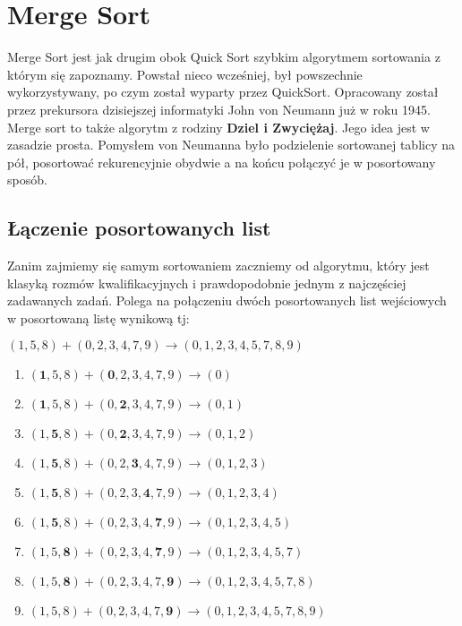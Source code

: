 \documentclass[knowledge.tex]{subfiles}
\begin{document}
    \section{Merge Sort}
    Merge Sort jest jak drugim obok Quick Sort szybkim algorytmem sortowania z którym się zapoznamy. Powstał nieco wcześniej, był powszechnie wykorzystywany, po czym został wyparty przez QuickSort. Opracowany został przez prekursora dzisiejszej informatyki John von Neumann już w roku 1945.\\[0.3cm]
    Merge sort to także algorytm z rodziny \textbf{Dziel i Zwyciężaj}. Jego idea jest w zasadzie prosta. Pomysłem von Neumanna było podzielenie sortowanej tablicy na pół, posortować rekurencyjnie obydwie a na końcu połączyć je w posortowany sposób.\\[0.3cm]
    \subsection*{Łączenie posortowanych list}
    Zanim zajmiemy się samym sortowaniem zaczniemy od algorytmu, który jest klasyką rozmów kwalifikacyjnych i prawdopodobnie jednym z najczęściej zadawanych zadań. Polega na połączeniu dwóch posortowanych list wejściowych w posortowaną listę wynikową tj:
    \begin{center}
        $(1, 5, 8) + (0, 2, 3, 4, 7, 9) \rightarrow (0,1,2,3,4,5,7,8,9)$
    \end{center}
    
    \begin{enumerate}
        \item $(\textbf{1}, 5, 8) + (\textbf{0}, 2, 3, 4, 7, 9) \rightarrow (0)$
        \item $(\textbf{1}, 5, 8) + (0, \textbf{2}, 3, 4, 7, 9) \rightarrow  (0,1)$
        \item $(1, \textbf{5}, 8) + (0, \textbf{2}, 3, 4, 7, 9) \rightarrow  (0,1,2)$
        \item $(1, \textbf{5}, 8) + (0, 2, \textbf{3}, 4, 7, 9) \rightarrow  (0,1,2,3)$
        \item $(1,\textbf{5}, 8) + (0, 2, 3, \textbf{4}, 7, 9) \rightarrow  (0,1,2,3,4)$
        \item $(1, \textbf{5}, 8) + (0, 2, 3, 4, \textbf{7}, 9) \rightarrow  (0,1,2,3,4,5)$
        \item $(1, 5, \textbf{8}) + (0, 2, 3, 4, \textbf{7}, 9) \rightarrow  (0,1,2,3,4,5,7)$
        \item $(1, 5, \textbf{8}) + (0, 2, 3, 4, 7, \textbf{9}) \rightarrow  (0,1,2,3,4,5,7,8)$
        \item $(1, 5, 8) + (0, 2, 3, 4, 7, \textbf{9}) \rightarrow  (0,1,2,3,4,5,7,8,9)$
    \end{enumerate}
    
\end{document}
